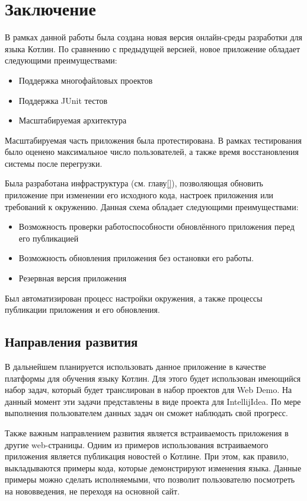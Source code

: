 \chapter*{Заключение}
	В рамках данной работы была создана новая версия онлайн-среды разработки для языка Котлин. По сравнению с предыдущей версией, новое приложение обладает следующими преимуществами:
\begin{itemize}
	\item Поддержка многофайловых проектов
	\item Поддержка JUnit тестов
	\item Масштабируемая архитектура
\end{itemize}
	
	Масштабируемая часть приложения была протестирована. В рамках тестирования было оценено максимальное число пользователей, а также время восстановления системы после перегрузки.
	
	Была разработана инфраструктура (см. главу\ref{}), позволяющая обновить приложение при изменении его исходного кода, настроек приложения или требований к окружению. Данная схема обладает следующими преимуществами:
	
\begin{itemize}
	\item Возможность проверки работоспособности обновлённого приложения перед его публикацией
	\item Возможность обновления приложения без остановки его работы.
	\item Резервная версия приложения
\end{itemize}

	Был автоматизирован процесс настройки окружения, а также процессы публикации приложения и его обновления.
	
\section*{Направления развития}

	В дальнейшем планируется использовать данное приложение в качестве платформы для обучения языку Котлин. Для этого будет использован имеющийся набор задач, который будет транслирован в набор проектов для Web Demo. На данный момент эти задачи представлены в виде проекта для IntellijIdea. По мере выполнения пользователем данных задач он сможет наблюдать свой прогресс.
	
	Также важным направлением развития является встраиваемость приложения в другие web-страницы. Одним из примеров использования встраиваемого приложения является публикация новостей о Котлине. При этом, как правило, выкладываются примеры кода, которые демонстрируют изменения языка. Данные примеры можно сделать исполняемыми, что позволит пользователю посмотреть на нововведения, не переходя на основной сайт.